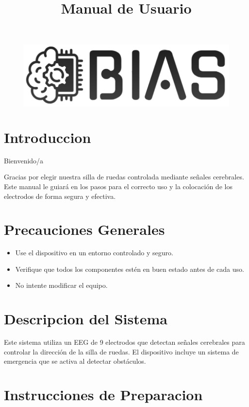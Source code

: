 \documentclass{article}
\title{Manual de Usuario}
\date{}
\begin{document}
 

\begin{figure}[H]
    \centering
    \includegraphics[width=1\linewidth]{Images/LogoBIASbn.png}
\end{figure}

\tableofcontents

\newpage

\section{Introduccion}
Bienvenido/a

Gracias por elegir nuestra silla de ruedas controlada mediante señales cerebrales. Este manual le guiará en los pasos para el correcto uso y la colocación de los electrodos de forma segura y efectiva.

\section{Precauciones Generales}
\begin{itemize}
    \item Use el dispositivo en un entorno controlado y seguro.
    \item Verifique que todos los componentes estén en buen estado antes de cada uso.
    \item No intente modificar el equipo.
\end{itemize}

\section{Descripcion del Sistema}
Este sistema utiliza un EEG de 9 electrodos que detectan señales cerebrales para controlar la dirección de la silla de ruedas. El dispositivo incluye un sistema de emergencia que se activa al detectar obstáculos.

\section{Instrucciones de Preparacion}
\end{document}

